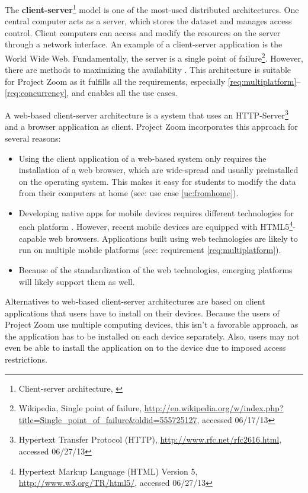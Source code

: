 The \textbf{client-server}\footnote{Client-server architecture, \cite{Berson_1996}} model is one of the most-used distributed architectures. One central computer acts as a server, which stores the dataset and manages access control. Client computers can access and modify the resources on the server through a network interface. An example of a client-server application is the World Wide Web. Fundamentally, the server is a single point of failure\footnote{Wikipedia, Single point of failure, \url{http://en.wikipedia.org/w/index.php?title=Single_point_of_failure&oldid=555725127}, accessed 06/17/13}. However, there are methods to maximizing the availability \cite{Gray_1991} \cite{Colyer_2000}. This architecture is suitable for Project Zoom as it fulfills all the requirements, especially \ref{req:multiplatform}–\ref{req:concurrency}, and enables all the use cases.

A web-based client-server architecture is a system that uses an HTTP-Server\footnote{Hypertext Transfer Protocol (HTTP), \url{http://www.rfc.net/rfc2616.html}, accessed 06/27/13} and a brow\-ser application as client. Project Zoom incorporates this approach for several reasons:
\begin{itemize}
\item Using the client application of a web-based system only requires the installation of a web browser, which are wide-spread and usually preinstalled on the operating system. This makes it easy for students to modify the data from their computers at home (see: use case \ref{uc:fromhome}).
\item Developing native apps for mobile devices requires different technologies for each platform \cite{Charland_2011}. However, recent mobile devices are equipped with HTML5\footnote{Hypertext Markup Language (HTML) Version 5, \url{http://www.w3.org/TR/html5/}, accessed 06/27/13}-capable web browsers. Applications built using web technologies are likely to run on multiple mobile platforms (see: requirement \ref{req:multiplatform}).
\item Because of the standardization of the web technologies, emerging platforms will likely support them as well.
\end{itemize}

Alternatives to web-based client-server architectures are based on client applications that users have to install on their devices. Because the users of Project Zoom use multiple computing devices, this isn't a favorable approach, as the application has to be installed on each device separately. Also, users may not even be able to install the application on to the device due to imposed access restrictions.

